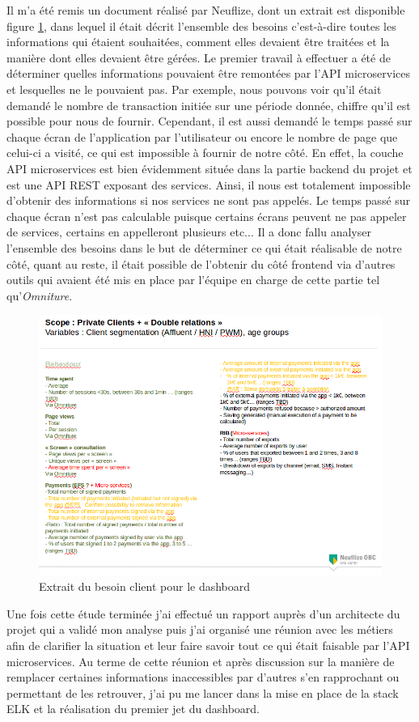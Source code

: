 	Il m'a été remis un document réalisé par Neuflize, dont un extrait est disponible figure \ref{elkBesoin}, dans lequel il était décrit l'ensemble des besoins c'est-à-dire toutes les informations qui étaient souhaitées, comment elles devaient être traitées et la manière dont elles devaient être gérées. Le premier travail à effectuer a été de déterminer quelles informations pouvaient être remontées par l'API microservices et lesquelles ne le pouvaient pas. Par exemple, nous pouvons voir qu'il était demandé le nombre de transaction initiée sur une période donnée, chiffre qu'il est possible pour nous de fournir. Cependant, il est aussi demandé le temps passé sur chaque écran de l'application par l'utilisateur ou encore le nombre de page que celui-ci a visité, ce qui est impossible à fournir de notre côté. En effet, la couche API microservices est bien évidemment située dans la partie backend du projet et est une API REST exposant des services. Ainsi, il nous est totalement impossible d'obtenir des informations si nos services ne sont pas appelés. Le temps passé sur chaque écran n'est pas calculable puisque certains écrans peuvent ne pas appeler de services, certains en appelleront plusieurs etc... Il a donc fallu analyser l'ensemble des besoins dans le but de déterminer ce qui était réalisable de notre côté, quant au reste, il était possible de l'obtenir du côté frontend via d'autres outils qui avaient été mis en place par l'équipe en charge de cette partie tel qu'\textit{Omniture}.
	
\begin{figure}[h!]
	\includegraphics[scale=0.6]{images/travailNeuflizeOBC/dashboard/elkBesoin.png}
	\centering
	\caption{Extrait du besoin client pour le dashboard}
	\label{elkBesoin}
\end{figure}
	
	Une fois cette étude terminée j'ai effectué un rapport auprès d'un architecte du projet qui a validé mon analyse puis j'ai organisé une réunion avec les métiers afin de clarifier la situation et leur faire savoir tout ce qui était faisable par l'API microservices. Au terme de cette réunion et après discussion sur la manière de remplacer certaines informations inaccessibles par d'autres s'en rapprochant ou permettant de les retrouver, j'ai pu me lancer dans la mise en place de la stack ELK et la réalisation du premier jet du dashboard.